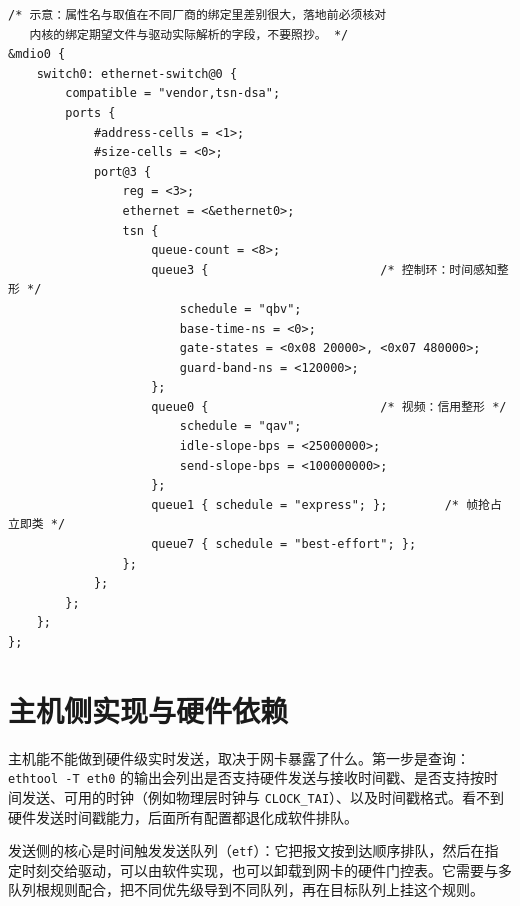 \documentclass[12pt,a4paper,fontset=fandol]{ctexbook}
\newcommand{\Tp}[1]{\texttt{#1}}
\begin{document}
\begin{lstlisting}[style=yamlstyle,caption={设备树：以示意形式声明端口的 TSN 队列调度策略},label={lst:ch12-dts-queues}]
/* 示意：属性名与取值在不同厂商的绑定里差别很大，落地前必须核对
   内核的绑定期望文件与驱动实际解析的字段，不要照抄。 */
&mdio0 {
    switch0: ethernet-switch@0 {
        compatible = "vendor,tsn-dsa";
        ports {
            #address-cells = <1>;
            #size-cells = <0>;
            port@3 {
                reg = <3>;
                ethernet = <&ethernet0>;
                tsn {
                    queue-count = <8>;
                    queue3 {                        /* 控制环：时间感知整形 */
                        schedule = "qbv";
                        base-time-ns = <0>;
                        gate-states = <0x08 20000>, <0x07 480000>;
                        guard-band-ns = <120000>;
                    };
                    queue0 {                        /* 视频：信用整形 */
                        schedule = "qav";
                        idle-slope-bps = <25000000>;
                        send-slope-bps = <100000000>;
                    };
                    queue1 { schedule = "express"; };        /* 帧抢占立即类 */
                    queue7 { schedule = "best-effort"; };
                };
            };
        };
    };
};
\end{lstlisting}

\section{主机侧实现与硬件依赖}

主机能不能做到硬件级实时发送，取决于网卡暴露了什么。第一步是查询：\Tp{ethtool -T eth0} 的输出会列出是否支持硬件发送与接收时间戳、是否支持按时间发送、可用的时钟（例如物理层时钟与 \Tp{CLOCK\_TAI}）、以及时间戳格式。看不到硬件发送时间戳能力，后面所有配置都退化成软件排队。

发送侧的核心是时间触发发送队列（\Tp{etf}）：它把报文按到达顺序排队，然后在指定时刻交给驱动，可以由软件实现，也可以卸载到网卡的硬件门控表。它需要与多队列根规则配合，把不同优先级导到不同队列，再在目标队列上挂这个规则。
\end{document}
